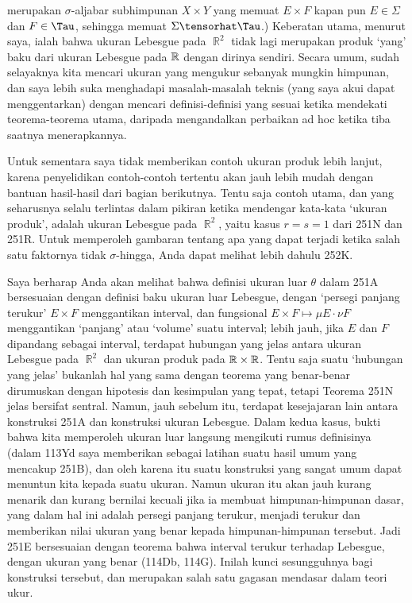{\noindent merupakan $\sigma$-aljabar subhimpunan $X\times Y$ yang memuat
$E\times F$ kapan pun $E\in\Sigma$ dan $F\in\Tau$, sehingga memuat
$\Sigma\tensorhat\Tau$.) Keberatan utama, menurut saya, ialah bahwa
ukuran Lebesgue pada $\BbbR^2$ tidak lagi merupakan produk `yang' baku dari ukuran Lebesgue
pada $\Bbb R$ dengan dirinya sendiri. Secara umum, sudah selayaknya kita mencari
ukuran yang mengukur sebanyak mungkin himpunan, dan saya lebih suka menghadapi
masalah-masalah teknis (yang saya akui dapat menggentarkan) dengan
mencari definisi-definisi yang sesuai ketika mendekati teorema-teorema utama,
daripada mengandalkan perbaikan ad hoc ketika tiba saatnya menerapkannya.

Untuk sementara saya tidak memberikan contoh ukuran produk lebih lanjut,
karena penyelidikan contoh-contoh tertentu akan jauh
lebih mudah dengan bantuan hasil-hasil dari bagian berikutnya. Tentu saja contoh
utama, dan yang seharusnya selalu terlintas dalam pikiran ketika mendengar
kata-kata `ukuran produk', adalah ukuran Lebesgue pada
$\BbbR^2$, yaitu kasus $r=s=1$ dari 251N dan 251R. Untuk memperoleh gambaran
tentang apa yang dapat terjadi ketika
salah satu faktornya tidak $\sigma$-hingga, Anda dapat melihat lebih dahulu 252K.

Saya berharap Anda akan melihat bahwa definisi ukuran luar
$\theta$ dalam 251A bersesuaian dengan definisi baku ukuran luar Lebesgue,
dengan `persegi panjang terukur' $E\times F$ menggantikan
interval, dan fungsional $E\times F\mapsto\mu E\cdot\nu F$
menggantikan `panjang' atau `volume' suatu interval;
lebih jauh, jika $E$ dan $F$ dipandang sebagai interval, terdapat hubungan yang jelas
antara ukuran Lebesgue pada $\BbbR^2$ dan ukuran produk
pada $\Bbb R\times\Bbb R$. Tentu saja suatu `hubungan yang jelas' bukanlah
hal yang sama dengan teorema yang benar-benar dirumuskan dengan hipotesis dan
kesimpulan yang tepat, tetapi Teorema 251N jelas bersifat sentral. Namun, jauh sebelum itu,
terdapat kesejajaran lain antara konstruksi 251A dan
konstruksi ukuran Lebesgue. Dalam kedua kasus, bukti bahwa kita memperoleh
ukuran luar langsung mengikuti rumus definisinya (dalam 113Yd saya memberikan
sebagai latihan suatu hasil umum yang mencakup 251B), dan oleh karena itu suatu
konstruksi yang sangat umum dapat menuntun kita kepada suatu ukuran. Namun ukuran itu
akan jauh kurang menarik dan kurang bernilai kecuali jika ia membuat himpunan-himpunan
dasar, yang dalam hal ini adalah persegi panjang terukur, menjadi terukur dan memberikan
nilai ukuran yang benar kepada himpunan-himpunan tersebut.
Jadi 251E bersesuaian dengan teorema bahwa interval terukur terhadap Lebesgue,
dengan ukuran yang benar (114Db, 114G). Inilah kunci sesungguhnya
bagi konstruksi tersebut, dan merupakan salah satu gagasan mendasar dalam teori ukur.

}
